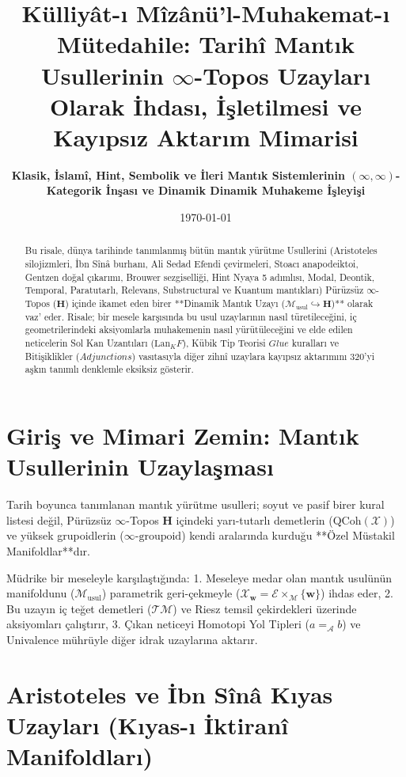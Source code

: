 \documentclass[11pt, a4paper]{article}
\title{\textbf{Külliyât-ı Mîzânü'l-Muhakemat-ı Mütedahile: Tarihî Mantık Usullerinin $\infty$-Topos Uzayları Olarak İhdası, İşletilmesi ve Kayıpsız Aktarım Mimarisi}}
\author{\textbf{Klasik, İslamî, Hint, Sembolik ve İleri Mantık Sistemlerinin $(\infty, \infty)$-Kategorik İnşası ve Dinamik Dinamik Muhakeme İşleyişi}}
\date{\today}
\begin{document}
\maketitle

\begin{abstract}
Bu risale, dünya tarihinde tanımlanmış bütün mantık yürütme Usullerini (Aristoteles silojizmleri, İbn Sînâ burhanı, Ali Sedad Efendi çevirmeleri, Stoacı anapodeiktoi, Gentzen doğal çıkarımı, Brouwer sezgiselliği, Hint Nyaya 5 adımlısı, Modal, Deontik, Temporal, Paratutarlı, Relevans, Substructural ve Kuantum mantıkları) Pürüzsüz $\infty$-Topos ($\mathbf{H}$) içinde ikamet eden birer **Dinamik Mantık Uzayı ($\mathcal{M}_{\text{usul}} \hookrightarrow \mathbf{H}$)** olarak vaz' eder. Risale; bir mesele karşısında bu usul uzaylarının nasıl türetileceğini, iç geometrilerindeki aksiyomlarla muhakemenin nasıl yürütüleceğini ve elde edilen neticelerin Sol Kan Uzantıları ($\text{Lan}_K F$), Kübik Tip Teorisi $Glue$ kuralları ve Bitişiklikler ($Adjunctions$) vasıtasıyla diğer zihnî uzaylara kayıpsız aktarımını 320'yi aşkın tanımlı denklemle eksiksiz gösterir.
\end{abstract}

\tableofcontents
\newpage

\section{Giriş ve Mimari Zemin: Mantık Usullerinin Uzaylaşması}

Tarih boyunca tanımlanan mantık yürütme usulleri; soyut ve pasif birer kural listesi değil, Pürüzsüz $\infty$-Topos $\mathbf{H}$ içindeki yarı-tutarlı demetlerin ($\text{QCoh}(\mathcal{X})$) ve yüksek grupoidlerin ($\infty\text{-groupoid}$) kendi aralarında kurduğu **Özel Müstakil Manifoldlar**dır. 

Müdrike bir meseleyle karşılaştığında:
1. Meseleye medar olan mantık usulünün manifoldunu ($\mathcal{M}_{\text{usul}}$) parametrik geri-çekmeyle ($\mathcal{X}_{\mathbf{w}} = \mathcal{E} \times_{\mathcal{M}} \{\mathbf{w}\}$) ihdas eder,
2. Bu uzayın iç teğet demetleri ($\mathcal{T}\mathcal{M}$) ve Riesz temsil çekirdekleri üzerinde aksiyomları çalıştırır,
3. Çıkan neticeyi Homotopi Yol Tipleri ($a =_{\mathcal{A}} b$) ve Univalence mührüyle diğer idrak uzaylarına aktarır.

\section{Aristoteles ve İbn Sînâ Kıyas Uzayları (Kıyas-ı İktiranî Manifoldları)}
\end{document}
